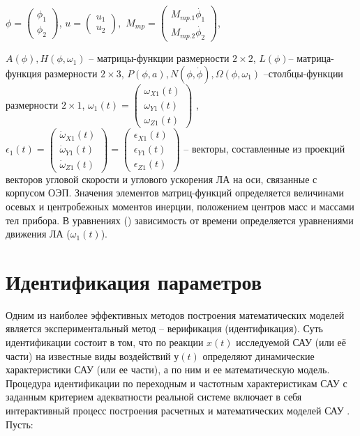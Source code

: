 $\phi{}=\left(\begin{array}{
	cc}
{\phi{}}_1 \\
{\phi{}}_2
\end{array}\right)$, $u=\left(\begin{array}{
	cc}
u_1 \\
u_2
\end{array}\right),$ $M_{mp}=\left(\begin{array}{
	cc}
M_{\textit{mp.1}} \dot{\phi_1} \\
M_{\textit{mp.2}} \dot{\phi_2}
\end{array}\right)$,

$A\left(\phi{}\right),H\left(\phi{},{\omega{}}_1\right)$ – матрицы-функции размерности $2 \times 2$, $L(\phi)$– матрица-функция размерности $2 \times 3$,
$P\left(\phi{},a\right),N\left(\phi{},\dot{\phi{}}\right),\Omega{}\left(\phi{},{\omega{}}_1\right)$ –столбцы-функции размерности $2 \times 1$,
${\omega{}}_1(t)=\left(\begin{array}{
	ccc}
{\omega{}}_{X1}(t) \\
{\omega{}}_{Y1}(t) \\
{\omega{}}_{Z1}(t)
\end{array}\right)$
, ${\epsilon{}}_1(t)=\left(\begin{array}{
	ccc}
{\dot{\omega{}}}_{X1}(t) \\
{\dot{\omega{}}}_{Y1}(t) \\
{\dot{\omega{}}}_{Z1}(t)
\end{array}\right)=\left(\begin{array}{
	ccc}
{\epsilon{}}_{X1}(t) \\
{\epsilon{}}_{Y1}(t) \\
{\epsilon{}}_{Z1}(t)
\end{array}\right)$
– векторы, составленные из проекций векторов угловой скорости и углового ускорения ЛА на оси, связанные с корпусом ОЭП. Значения элементов матриц-функций определяется величинами осевых и центробежных моментов инерции, положением центров масс и массами тел прибора. В уравнениях () зависимость от времени определяется уравнениями движения ЛА ($\omega_1(t)$).

\section{Идентификация параметров} \label{sec:ch2/sec4}

Одним из наиболее эффективных методов построения математических моделей является экспериментальный метод – верификация (идентификация). Суть идентификации состоит в том, что по реакции $x(t)$ исследуемой САУ (или её части) на известные виды воздействий $у(t)$ определяют динамические характеристики САУ (или ее части), а по ним и ее математическую модель. Процедура идентификации по переходным и частотным характеристикам САУ с заданным критерием адекватности реальной системе включает в себя интерактивный процесс построения расчетных и математических моделей САУ \cite[]{Karpov}. Пусть:


